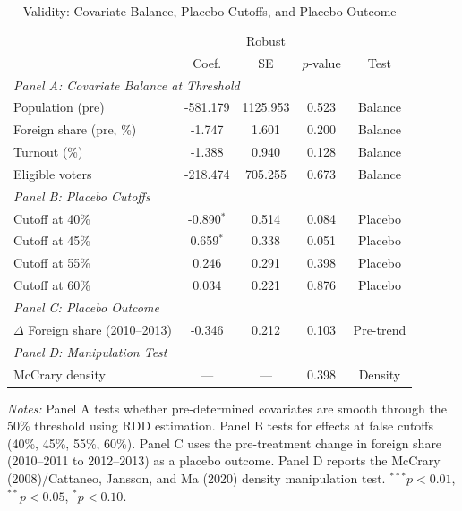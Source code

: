 \begin{table}[t]
\centering
\caption{Validity: Covariate Balance, Placebo Cutoffs, and Placebo Outcome}
\label{tab:validity}
\begin{tabular}{lcccc}
\hline\hline
 & & Robust & & \\
 & Coef. & SE & $p$-value & Test \\
\hline
\multicolumn{5}{l}{\textit{Panel A: Covariate Balance at Threshold}} \\
[4pt]
Population (pre) & -581.179 & 1125.953 & 0.523 & Balance \\
Foreign share (pre, \%) & -1.747 & 1.601 & 0.200 & Balance \\
Turnout (\%) & -1.388 & 0.940 & 0.128 & Balance \\
Eligible voters & -218.474 & 705.255 & 0.673 & Balance \\
[8pt]
\multicolumn{5}{l}{\textit{Panel B: Placebo Cutoffs}} \\
[4pt]
Cutoff at 40\% & -0.890$^{*}$ & 0.514 & 0.084 & Placebo \\
Cutoff at 45\% & 0.659$^{*}$ & 0.338 & 0.051 & Placebo \\
Cutoff at 55\% & 0.246 & 0.291 & 0.398 & Placebo \\
Cutoff at 60\% & 0.034 & 0.221 & 0.876 & Placebo \\
[8pt]
\multicolumn{5}{l}{\textit{Panel C: Placebo Outcome}} \\
[4pt]
$\Delta$ Foreign share (2010--2013) & -0.346 & 0.212 & 0.103 & Pre-trend \\
[4pt]
\multicolumn{5}{l}{\textit{Panel D: Manipulation Test}} \\
[4pt]
McCrary density & --- & --- & 0.398 & Density \\
\hline\hline
\end{tabular}
\begin{tablenotes}[flushleft]
\small
\item \textit{Notes:} Panel A tests whether pre-determined covariates are smooth through the 50\% threshold using RDD estimation. Panel B tests for effects at false cutoffs (40\%, 45\%, 55\%, 60\%). Panel C uses the pre-treatment change in foreign share (2010--2011 to 2012--2013) as a placebo outcome. Panel D reports the McCrary (2008)/Cattaneo, Jansson, and Ma (2020) density manipulation test. $^{***}p<0.01$, $^{**}p<0.05$, $^{*}p<0.10$.
\end{tablenotes}
\end{table}

